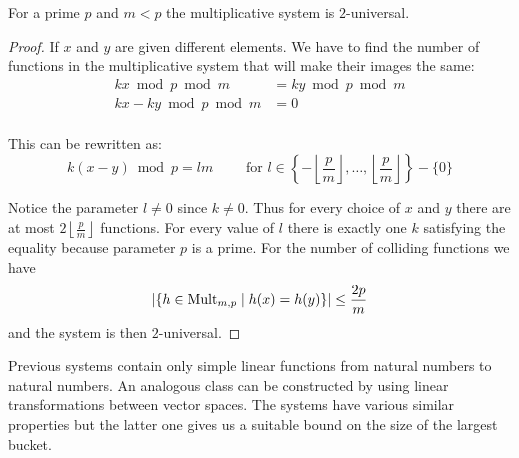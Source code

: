 \begin{theorem}
For a prime $p$ and $m < p$ the multiplicative system is $2$-universal.
\end{theorem}
\begin{proof}
If $x$ and $y$ are given different elements. We have to find the number of functions in the multiplicative system that will make their images the same:
\begin{displaymath}
\begin{split}
kx \bmod p \bmod m & = ky \bmod p \bmod m \\
kx - ky \bmod p \bmod m & = 0 \\
\end{split}
\end{displaymath}

This can be rewritten as:
\begin{displaymath}
k(x - y) \bmod p = l m \qquad \text{ for  } l \in \left\lbrace -\left\lfloor\frac{p}{m}\right\rfloor, \dots, \left\lfloor\frac{p}{m}\right\rfloor \right\rbrace - \{0\}
\end{displaymath}

Notice the parameter $l \neq 0$ since $k \neq 0$. Thus for every choice of $x$ and $y$ there are at most $2\left\lfloor\frac{p}{m}\right\rfloor$ functions. For every value of $l$ there is exactly one $k$ satisfying the equality because parameter $p$ is a prime. For the number of colliding functions we have \[ | \lbrace h \in \mathrm{Mult}_{m,p} \mid h(x) = h(y) \rbrace | \leq \frac{2p}{m} \] and the system is then $2$-universal.
\end{proof}

Previous systems contain only simple linear functions from natural numbers to natural numbers. An analogous class can be constructed by using linear transformations between vector spaces. The systems have various similar properties but the latter one gives us a suitable bound on the size of the largest bucket.

